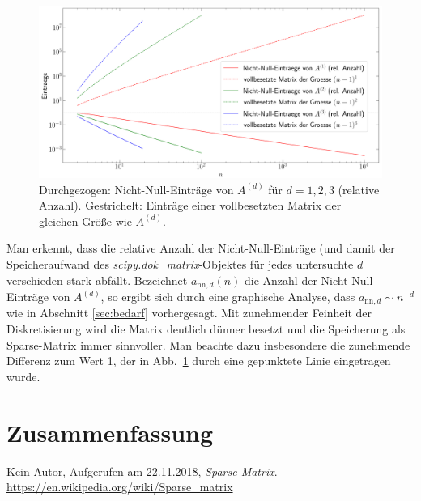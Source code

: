 \documentclass[smallheadings]{scrartcl}
\begin{document}
\begin{figure}[H]
\includegraphics[width=\textwidth]{Bilder/nn_eintraege}

\caption{Durchgezogen: Nicht-Null-Einträge von $A^{(d)}$ für $d=1,2,3$ (relative Anzahl). Gestrichelt: Einträge einer vollbesetzten Matrix der gleichen Größe wie $A^{(d)}$.}
\label{im:nn_eintr}
\end{figure}



Man erkennt, dass die relative Anzahl der Nicht-Null-Einträge (und damit der Speicheraufwand des \textit{scipy.dok\_matrix}-Objektes für jedes untersuchte $d$ verschieden stark abfällt. Bezeichnet $a_{\text{nn},d}(n)$ die Anzahl der 
Nicht-Null-Einträge von $A^{(d)}$, so ergibt sich durch eine graphische Analyse, dass $a_{\text{nn},d}\sim n^{-d}$ wie in Abschnitt \ref{sec:bedarf} vorhergesagt. Mit zunehmender Feinheit der Diskretisierung wird die Matrix deutlich dünner besetzt und die Speicherung als Sparse-Matrix immer sinnvoller. Man beachte dazu insbesondere die zunehmende Differenz zum Wert 1, der in Abb.~\ref{im:nn_eintr} durch eine gepunktete Linie eingetragen wurde. 


\section{Zusammenfassung}


\begin{thebibliography}{9}
 Kein Autor, Aufgerufen am 22.11.2018, \textit{Sparse Matrix}. 
\url{https://en.wikipedia.org/wiki/Sparse_matrix}
\end{thebibliography}


\end{document}
